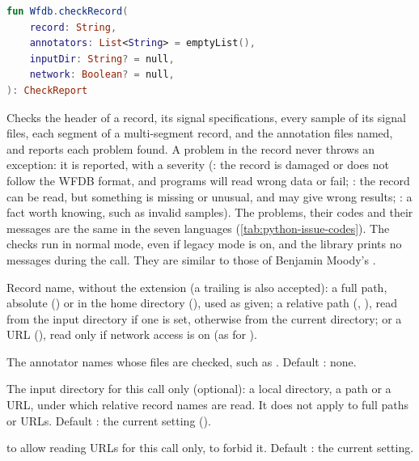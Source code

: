 \begin{lstlisting}[language=Kotlin,style=signature]
fun Wfdb.checkRecord(
    record: String,
    annotators: List<String> = emptyList(),
    inputDir: String? = null,
    network: Boolean? = null,
): CheckReport
\end{lstlisting}
Checks the header of a record, its signal specifications, every sample of its signal
files, each segment of a multi-segment record, and the annotation files named, and
reports each problem found. A problem in the record never throws an exception: it is
reported, with a severity (: the record is damaged or does not follow
the WFDB format, and programs will read wrong data or fail; : the
record can be read, but something is missing or unusual, and may give wrong results;
: a fact worth knowing, such as invalid samples). The problems, their
codes and their messages are the same in the seven languages
(\cref{tab:python-issue-codes}). The checks run in normal mode, even if legacy mode is on,
and the library prints no messages during the call. They are similar to those of Benjamin
Moody's .
\begin{params}
\item[record] Record name, without the  extension (a trailing  is
  also accepted): a full path, absolute () or in the home
  directory (), used as given; a relative path
  (, ), read from the input directory if one is set,
  otherwise from the current directory; or a URL
  (), read only if network access is
  on (as for ).
\item[annotators] The annotator names whose files are checked, such as
  . Default : none.
\item[inputDir] The input directory for this call only (optional): a local directory, a
  \code{\textasciitilde} path or a URL, under which relative record names are read. It
  does not apply to full paths or URLs. Default : the current setting
  ().
\item[network]  to allow reading URLs for this call only,  to
  forbid it. Default : the current setting.
\end{params}
